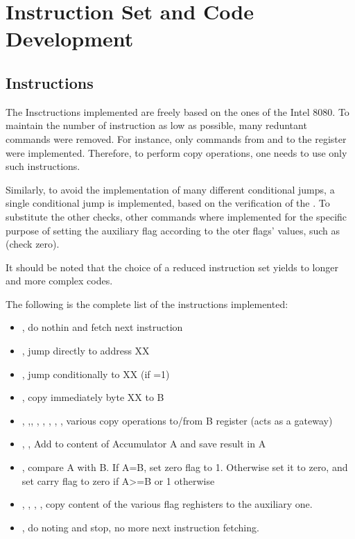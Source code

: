 \section{Instruction Set and Code Development} \label{sec:code}
\subsection{Instructions}
The Insctructions implemented are freely based on the ones of the Intel 8080.
To maintain the number of instruction as low as possible, many reduntant commands were removed.
For instance, only  commands from and to the  register
were implemented. Therefore, to perform copy operations, one needs to use only such instructions.

Similarly, to avoid the implementation of many different conditional jumps,
a single  conditional jump is implemented, based on the verification of the .
To substitute the other checks, other commands where implemented for the specific purpose of setting the
auxiliary flag according to the oter flags' values, such as  (check zero).

It should be noted that the choice of a reduced instruction set
yields to longer and more complex codes.

The following is the complete list of the instructions implemented:
\begin{itemize}
    \item {}, do nothin and fetch next instruction
    \item {}, jump directly to address XX
    \item {}, jump conditionally to XX (if =1)
    \item {}, copy immediately byte XX to B
    \item {}, ,, 
    , , , , , 
    various copy operations to/from B register (acts as a gateway)
    \item {}, , Add to content of Accumulator A and save result in A
    \item {}, compare A with B. If A=B, set zero flag to 1. Otherwise set it to zero, and set carry flag to zero if A>=B
    or 1 otherwise
    \item {}, , , , copy content of the various flag reghisters to the auxiliary one.
    \item {}, do noting and stop, no more next instruction fetching.
\end{itemize}

